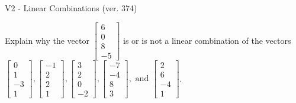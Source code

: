 \begin{exercise}
  \begin{exerciseTitle}V2 - Linear Combinations (ver. 374)\end{exerciseTitle}
  \begin{exerciseStatement}
    Explain why the vector \(\left[\begin{array}{c}
6 \\
0 \\
8 \\
-5
\end{array}\right]\)  is or is not a linear 
	combination of the vectors \(\left[\begin{array}{c}
0 \\
1 \\
-3 \\
1
\end{array}\right] , \left[\begin{array}{c}
-1 \\
2 \\
2 \\
1
\end{array}\right] , \left[\begin{array}{c}
3 \\
2 \\
0 \\
-2
\end{array}\right] , \left[\begin{array}{c}
-7 \\
-4 \\
8 \\
3
\end{array}\right] , \text{ and } \left[\begin{array}{c}
2 \\
6 \\
-4 \\
1
\end{array}\right]\).
	



\end{exerciseStatement}
\end{exercise}

